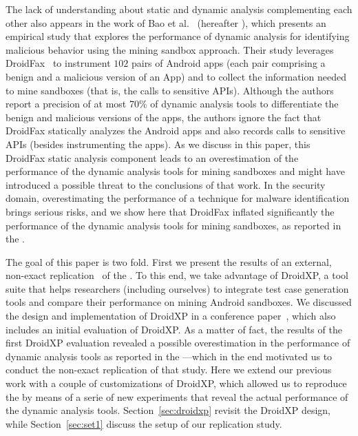 The lack of understanding about static and dynamic analysis complementing each other also appears in the work of Bao et al.~\cite{DBLP:conf/wcre/BaoLL18} (hereafter \blls), which presents an empirical study that explores the performance of dynamic analysis for identifying malicious behavior using the mining sandbox approach.  %
Their study leverages DroidFax~\cite{DBLP:conf/icsm/CaiR17a} to instrument $102$ pairs of Android apps (each pair comprising a benign and a malicious version of an App) and to collect the information needed to mine sandboxes (that is, the calls to sensitive APIs).
Although the authors report a precision of at most 70\% of dynamic analysis tools to differentiate the benign and malicious versions of the apps, the authors ignore the fact that DroidFax statically analyzes the Android apps and also records calls to sensitive APIs (besides instrumenting the apps). As we discuss in this paper, this DroidFax static analysis component leads to an overestimation of the performance of the dynamic analysis tools for mining sandboxes and might have introduced a possible threat to the conclusions of that work. In the security domain, overestimating the performance of a technique for malware identification brings serious risks, and we show here that DroidFax inflated significantly the performance of the dynamic analysis tools for mining sandboxes, as reported in the \blls.

The goal of this paper is two fold. First we present the results of an
external, non-exact replication~\cite{role-of-replication} of the \blls. To this end,
we take advantage of DroidXP, a tool suite that helps researchers (including ourselves) to
integrate test case generation tools and compare their performance on
mining Android sandboxes. We discussed the design and implementation of DroidXP in a conference
paper~\cite{DBLP:conf/scam/CostaMCMVBC20}, which also
includes an initial evaluation of DroidXP.
As a matter of fact, the results of the first DroidXP evaluation revealed a possible
overestimation in the performance of dynamic analysis tools as
reported in the \blls---which in the end motivated us to
conduct the non-exact replication of that study. Here we extend
our previous work with a couple of customizations of DroidXP, which allowed us
to reproduce the \blls by means of a serie of new experiments
that reveal the actual performance of the
dynamic analysis tools. Section~\ref{sec:droidxp} revisit the
DroidXP design, while Section~\ref{sec:set1} discuss
the setup of our replication study.



